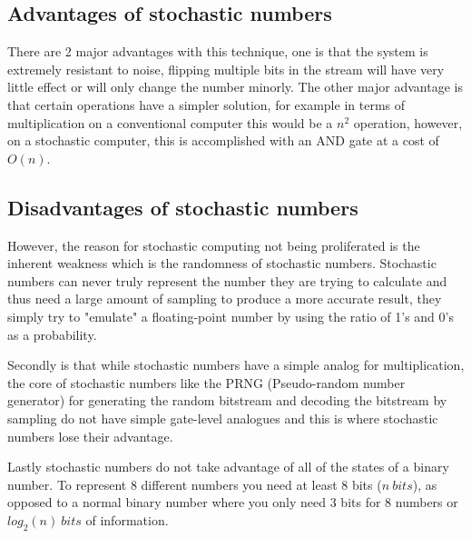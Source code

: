 \documentclass[a4paper,oneside,phd,etd]{BYUPhys}
\begin{document}
\subsection{Advantages of stochastic numbers}
There are 2 major advantages with this technique, one is that the system is extremely resistant to noise\cite{8122049}, flipping multiple bits in the stream will have very little effect or will only change the number minorly. The other major advantage is that certain operations have a simpler solution, for example in terms of multiplication on a conventional computer this would be a $n^2$ operation, however, on a stochastic computer, this is accomplished with an AND gate at a cost of $O(n)$.

\subsection{Disadvantages of stochastic numbers}
However, the reason for stochastic computing not being proliferated is the inherent weakness which is the randomness of stochastic numbers. Stochastic numbers can never truly represent the number they are trying to calculate and thus need a large amount of sampling to produce a more accurate result, they simply try to "emulate" a floating-point number by using the ratio of 1's and 0's as a probability.

Secondly is that while stochastic numbers have a simple analog for multiplication, the core of stochastic numbers like the PRNG (Pseudo-random number generator) for generating the random bitstream and decoding the bitstream by sampling do not have simple gate-level analogues and this is where stochastic numbers lose their advantage.

Lastly stochastic numbers do not take advantage of all of the states of a binary number. To represent 8 different numbers you need at least 8 bits ($n\ bits$), as opposed to a normal binary number where you only need 3 bits for 8 numbers or $log_2(n)\ bits$ of information.

\end{document}
